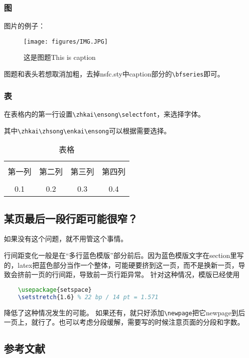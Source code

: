 \subsubsection{图}
图片的例子：
\begin{figure}[h!]
\centering %
\texttt{[image: figures/IMG.JPG]}
\captionsetup{justification=centering} %
\caption{这是图题This is caption}
\end{figure}

图题和表头若想取消加粗，去掉nsfc.sty中caption部分的\verb|\bfseries|即可。


\subsubsection{表}
在表格内的第一行设置\verb|\zhkai\ensong\selectfont|，来选择字体。

其中\verb|\zhkai\zhsong\enkai\ensong|可以根据需要选择。
\begin{table}[htbp]
	\zhkai\ensong\selectfont%
	\centering  %
	\caption{表格}  %
	\label{table1}  %
	\begin{tabular}{|c|c|c|c|}  
		\hline  %
		& & & \\[-6pt]  %
		第一列&第二列&第三列&第四列 \\  %
		\hline
		& & & \\[-6pt]  %
		0.1&0.2&0.3&0.4 \\
		\hline
	\end{tabular}
\end{table}

\subsection{某页最后一段行距可能很窄？}
如果没有这个问题，就不用管这个事情。

行间距变化一般是在“多行蓝色模版”部分前后。因为蓝色模版文字在section里写的，latex把蓝色部分当作一个整体，可能硬要挤到这一页，而不是换新一页，导致会挤前一页的行间距，导致前一页行距异常。
针对这种情况，模版已经使用
\begin{lstlisting}[language=tex, basicstyle=\ttfamily\small, keywordstyle=\color{blue}, commentstyle=\color{gray}]
	%自动段落的行间距微调
	\usepackage{setspace}
	\setstretch{1.6} % 22 bp / 14 pt = 1.571
\end{lstlisting}
降低了这种情况发生的可能。
如果还有，就只好添加\verb|\newpage|把它newpage到后一页上，就行了。也可以考虑分段缓解，需要写的时候注意页面的分段和字数。

\begin{REF}
\subsection*{参考文献}
\vspace{-50pt}
\end{REF}

\newpage%

